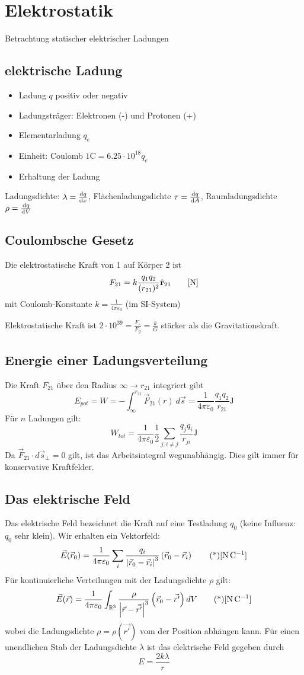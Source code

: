 \section{Elektrostatik}
Betrachtung statischer elektrischer Ladungen
\subsection{elektrische Ladung}
\begin{itemize}
    \item Ladung $q$ positiv oder negativ
    \item Ladungsträger: Elektronen (-) und Protonen (+)
    \item Elementarladung $q_e$
    \item Einheit: Coulomb $1\si{\coulomb} = 6.25\cdot10^{18} q_e$
    \item Erhaltung der Ladung
\end{itemize}

Ladungsdichte: $\lambda = \diff qx$, Flächenladungsdichte $\tau = \diff qA$, Raumladungsdichte $\rho = \diff qV$

\subsection{Coulombsche Gesetz}
Die elektrostatische Kraft von 1 auf Körper 2 ist
\[F_{21} = k \frac{q_1q_2}{ (r_{21})^2}\evec{r}_{21}\tag*{[\si{\newton}]}\]
mit Coulomb-Konstante $k = \frac{1}{4\pi \varepsilon_0}$ (im SI-System)

Elektrostatische Kraft ist $2\cdot 10^{39} = \frac{F_e}{F_g} = \frac{k}{G}$ stärker als die Gravitationskraft.

\subsection{Energie einer Ladungsverteilung}
Die Kraft $F_{21}$ über den Radius $\infty \to r_{21}$ integriert gibt
\[E_{pot} = W = -\int_\infty^{r_{21}}\vec{F}_{21}(r)\ d\vec{s} = \frac{1}{4\pi \varepsilon_0}\frac{q_1q_2}{r_{21}}\unit{\joule}\]
Für $n$ Ladungen gilt:
\[W_{tot} = \frac{1}{4\pi \varepsilon_0}\frac{1}{2}\sum_{j, i\neq j} \frac{q_j q_i}{r_{ji}}\unit{\joule}\]
Da $\vec{F}_{21} \cdot d\vec{s}_\perp = 0$ gilt, ist das Arbeitsintegral wegunabhängig. Dies gilt immer für konservative Kraftfelder.

\subsection{Das elektrische Feld}
Das elektrische Feld bezeichnet die Kraft auf eine Testladung $q_0$ (keine Influenz: $q_0$ sehr klein). Wir erhalten ein Vektorfeld:
\[\vec{E}(\vec{r}_0) = \frac{1}{4\pi \varepsilon_0} \sum_{i} \frac{q_i}{\abs{\vec{r}_0 - \vec{r}_i}^3}\bk{\vec{r}_0 - \vec{r}_i} \unit{\newton \per \coulomb}\]
Für kontinuierliche Verteilungen mit der Ladungsdichte $\rho$ gilt:
\[\vec{E}(\vec{r}) = \frac{1}{4\pi \varepsilon_0} \int_{\R^3} \frac{\rho}{\abs{\vec{r} - \vec{r'}}^3}\bk{\vec{r}_0 - \vec{r'}}dV \unit{\newton \per \coulomb}\]
wobei die Ladungsdichte $\rho = \rho(\vec{r'})$ vom der Position abhängen kann. Für einen unendlichen Stab der Ladungsdichte $\lambda$ ist das elektrische Feld gegeben durch
\[E = \frac{2k\lambda}{r}\]
